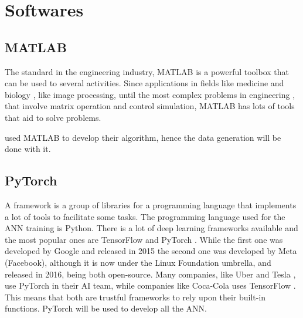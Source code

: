 \section{Softwares}

\subsection{MATLAB}

The standard in the engineering industry, MATLAB is a powerful toolbox that can be used to several activities.
Since applications in fields like medicine and biology \cite{demirkaya2009}, like image processing, until the most complex problems in engineering \cite{bansal}, that involve matrix operation and control simulation, MATLAB has lots of tools that aid to solve problems.

\textcite{geronel2023} used MATLAB to develop their algorithm, hence the data generation will be done with it.

\subsection{PyTorch}

A framework is a group of libraries for a programming language that implements a lot of tools to facilitate some tasks.
The programming language used for the ANN training is Python.
There is a lot of deep learning frameworks available and the most popular ones are TensorFlow \cite{abadi2016} and PyTorch \cite{paszke2019}. 
While the first one was developed by Google and released in 2015 the second one was developed by Meta (Facebook), although it is now under the Linux Foundation umbrella, and released in 2016, being both open-source.
Many companies, like Uber \cite{goodman2017} and Tesla \cite{pytorch2019}, use PyTorch in their AI team, while companies like Coca-Cola uses TensorFlow \cite{tensorflow2018}.
This means that both are trustful frameworks to rely upon their built-in functions.
PyTorch will be used to develop all the ANN.